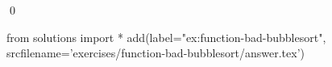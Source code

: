 \begin{ex}
  \label{ex:function-bad-bubblesort}
  
  \qed
\end{ex}
\begin{python0}
from solutions import *
add(label="ex:function-bad-bubblesort",
    srcfilename='exercises/function-bad-bubblesort/answer.tex') 
\end{python0}                              
